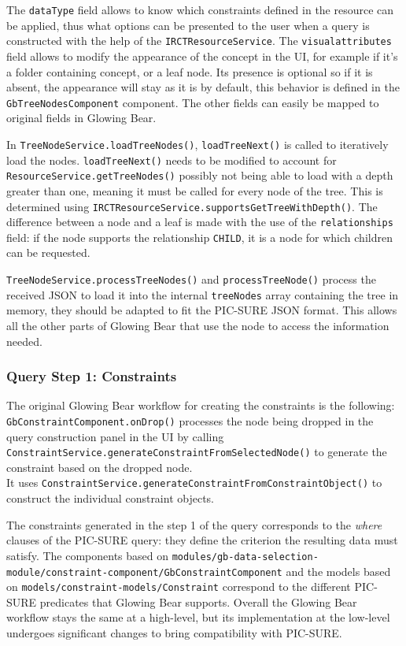 The \verb|dataType| field allows to know which constraints defined in the resource can be applied, thus what options can be presented to the user when a query is constructed with the help of the \verb|IRCTResourceService|.
The \verb|visualattributes| field allows to modify the appearance of the concept in the UI, for example if it's a folder containing concept, or a leaf node. 
Its presence is optional so if it is absent, the appearance will stay as it is by default, this behavior is defined in the \verb|GbTreeNodesComponent| component.
The other fields can easily be mapped to original fields in Glowing Bear.

In \verb|TreeNodeService.loadTreeNodes()|, \verb|loadTreeNext()| is called to iteratively load the nodes.
\verb|loadTreeNext()| needs to be modified to account for \verb|ResourceService.getTreeNodes()| possibly not being able to load with a depth greater than one, meaning it must be called for every node of the tree.
This is determined using \verb|IRCTResourceService.supportsGetTreeWithDepth()|.
The difference between a node and a leaf is made with the use of the \verb|relationships| field: if the node supports the relationship \verb|CHILD|, it is a node for which children can be requested.

\verb|TreeNodeService.processTreeNodes()| and \verb|processTreeNode()| process the received JSON to load it into the internal \verb|treeNodes| array containing the tree in memory, they should be adapted to fit the PIC-SURE JSON format.
This allows all the other parts of Glowing Bear that use the node to access the information needed.


\subsubsection{Query Step 1: Constraints}

The original Glowing Bear workflow for creating the constraints is the following: \\
\verb|GbConstraintComponent.onDrop()| processes the node being dropped in the query construction panel in the UI by calling \verb|ConstraintService.generateConstraintFromSelectedNode()| to generate the constraint based on the dropped node. \\
It uses \verb|ConstraintService.generateConstraintFromConstraintObject()| to construct the individual constraint objects.

The constraints generated in the step 1 of the query corresponds to the \emph{where} clauses of the PIC-SURE query: they define the criterion the resulting data must satisfy.
The components based on \verb|modules/gb-data-selection-module/constraint-component/GbConstraintComponent| and the models based on \verb|models/constraint-models/Constraint| correspond to the different PIC-SURE predicates that Glowing Bear supports.
Overall the Glowing Bear workflow stays the same at a high-level, but its implementation at the low-level undergoes significant changes to bring compatibility with PIC-SURE.

